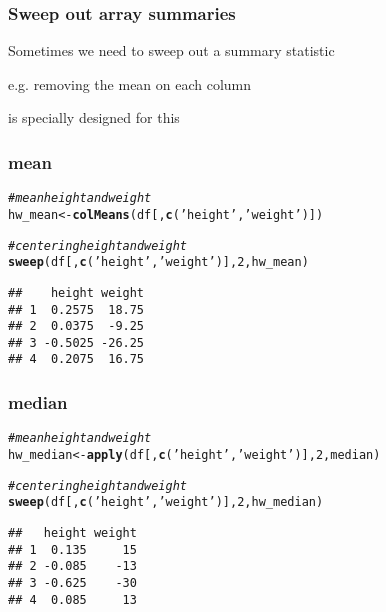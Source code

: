 \documentclass[12pt]{beamer}\usepackage[]{graphicx}\usepackage[]{color}
\makeatletter
\newcommand{\hlnum}[1]{\textcolor[rgb]{0.686,0.059,0.569}{#1}}%
\newcommand{\hlstr}[1]{\textcolor[rgb]{0.192,0.494,0.8}{#1}}%
\newcommand{\hlcom}[1]{\textcolor[rgb]{0.678,0.584,0.686}{\textit{#1}}}%
\newcommand{\hlstd}[1]{\textcolor[rgb]{0.345,0.345,0.345}{#1}}%
\newcommand{\hlkwb}[1]{\textcolor[rgb]{0.69,0.353,0.396}{#1}}%
\newcommand{\hlkwd}[1]{\textcolor[rgb]{0.737,0.353,0.396}{\textbf{#1}}}%
\newenvironment{kframe}{%
 \def\at@end@of@kframe{}%
 \ifinner\ifhmode%
  \def\at@end@of@kframe{\end{minipage}}%
  \begin{minipage}{\columnwidth}%
 \fi\fi%
 \def\FrameCommand##1{\hskip\@totalleftmargin \hskip-\fboxsep
 \colorbox{shadecolor}{##1}\hskip-\fboxsep
     \hskip-\linewidth \hskip-\@totalleftmargin \hskip\columnwidth}%
 \MakeFramed {\advance\hsize-\width
   \@totalleftmargin\z@ \linewidth\hsize
   \@setminipage}}%
 {\par\unskip\endMakeFramed%
 \at@end@of@kframe}
\newenvironment{knitrout}{}{} %
\makeatother
\begin{document}

\begin{frame}
\frametitle{Sweep out array summaries}

\bbi
  \item Sometimes we need to sweep out a summary statistic
  \item e.g. removing the mean on each column
  \item {} is specially designed for this
\ei

\end{frame}


\begin{frame}[fragile]
\frametitle{ mean}

\begin{knitrout}\footnotesize
{}\color{fgcolor}\begin{kframe}
\begin{alltt}
\hlcom{# mean height and weight}
\hlstd{hw_mean} \hlkwb{<-} \hlkwd{colMeans}\hlstd{(df[ ,}\hlkwd{c}\hlstd{(}\hlstr{'height'}\hlstd{,} \hlstr{'weight'}\hlstd{)])}

\hlcom{# centering height and weight}
\hlkwd{sweep}\hlstd{(df[ ,}\hlkwd{c}\hlstd{(}\hlstr{'height'}\hlstd{,} \hlstr{'weight'}\hlstd{)],} \hlnum{2}\hlstd{, hw_mean)}
\end{alltt}
\begin{verbatim}
##    height weight
## 1  0.2575  18.75
## 2  0.0375  -9.25
## 3 -0.5025 -26.25
## 4  0.2075  16.75
\end{verbatim}
\end{kframe}
\end{knitrout}

\end{frame}


\begin{frame}[fragile]
\frametitle{ median}

\begin{knitrout}\footnotesize
{}\color{fgcolor}\begin{kframe}
\begin{alltt}
\hlcom{# mean height and weight}
\hlstd{hw_median} \hlkwb{<-} \hlkwd{apply}\hlstd{(df[ ,}\hlkwd{c}\hlstd{(}\hlstr{'height'}\hlstd{,} \hlstr{'weight'}\hlstd{)],} \hlnum{2}\hlstd{, median)}

\hlcom{# centering height and weight}
\hlkwd{sweep}\hlstd{(df[ ,}\hlkwd{c}\hlstd{(}\hlstr{'height'}\hlstd{,} \hlstr{'weight'}\hlstd{)],} \hlnum{2}\hlstd{, hw_median)}
\end{alltt}
\begin{verbatim}
##   height weight
## 1  0.135     15
## 2 -0.085    -13
## 3 -0.625    -30
## 4  0.085     13
\end{verbatim}
\end{kframe}
\end{knitrout}

\end{frame}
\end{document}

